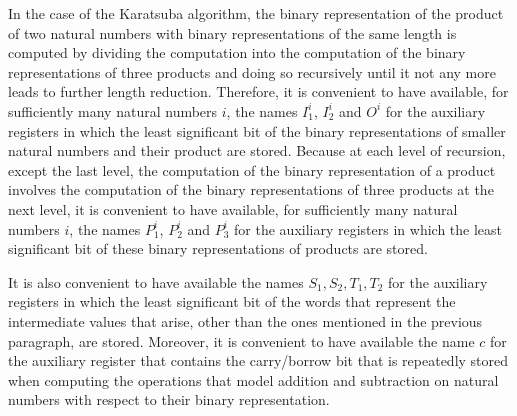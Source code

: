\documentclass{llncs}
\begin{document}
In the case of the Karatsuba algorithm, the binary representation of the 
product of two natural numbers with binary representations of the same 
length is computed by dividing the computation into the computation of 
the binary representations of three products and doing so recursively 
until it not any more leads to further length reduction. 
Therefore, it is convenient to have available, for sufficiently many 
natural numbers $i$, the names $I_1^i$, $I_2^i$ and $O^i$ for the 
auxiliary registers in which the least significant bit of the binary
representations of smaller natural numbers and their product are stored. 
Because at each level of recursion, except the last level, the 
computation of the binary representation of a product involves the 
computation of the binary representations of three products at the next 
level, it is convenient to have available, for sufficiently many natural 
numbers $i$, the names $P_1^i$, $P_2^i$ and $P_3^i$ for the auxiliary 
registers in which the least significant bit of these binary 
representations of products are stored. 

It is also convenient to have available the names $S_1,S_2,T_1,T_2$ for 
the auxiliary registers in which the least significant bit of the words 
that represent the intermediate values that arise, other than the ones 
mentioned in the previous paragraph, are stored.
Moreover, it is convenient to have available the name $c$ for the 
auxiliary register that contains the carry/borrow bit that is repeatedly 
stored when computing the operations that model addition and subtraction 
on natural numbers with respect to their binary representation.
\end{document}
